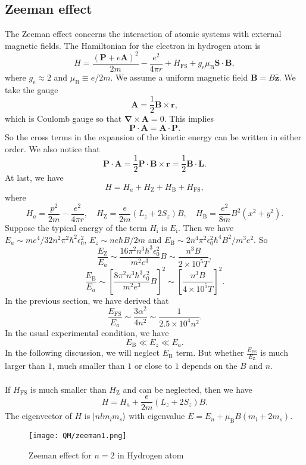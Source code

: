 \subsection{Zeeman effect}
The Zeeman effect concerns the interaction of atomic systems with external magnetic fields. The Hamiltonian for the electron in hydrogen atom is
\[H = \frac{(\bm{P}+e\bm{A})^2}{2m} - \frac{e^2}{4\pi r} + H_{\mathrm{FS}} + g_{\mathrm{e}} \mu_{\mathrm{B}}\bm{S}\cdot\bm{B},\]
where $g_{\mathrm{e}} \approx 2$ and $\mu_{\mathrm{B}} \equiv {e}/{2m}$.
We assume a uniform magnetic field $\bm{B} = B\hat{\bm{z}}$. We take the gauge
\[\bm{A} = \frac{1}{2}\bm{B}\times\bm{r},\]
which is Coulomb gauge so that $\bm{\nabla}\times\bm{A} = 0$. This implies
\[\bm{P}\cdot\bm{A} = \bm{A}\cdot\bm{P}.\]
So the cross terms in the expansion of the kinetic energy can be written in either order. 
We also notice that
\[\bm{P}\cdot\bm{A} = \frac{1}{2} \bm{P}\cdot\bm{B}\times\bm{r}  = \frac{1}{2}\bm{B}\cdot\bm{L}.\] 
At last, we have
\[H = H_a + H_{\mathrm{Z}} + H_{\mathrm{B}} + H_{\mathrm{FS}},\]
where
\[H_a = \frac{p^2}{2m} - \frac{e^2}{4\pi r} , \quad  H_{\mathrm{Z}} = \frac{e}{2m}(L_z + 2S_z)B , \quad H_{\mathrm{B}} = \frac{e^2}{8m}B^2(x^2+y^2).\]
Suppose the typical energy of the term $H_{\mathrm{i}}$ is $E_{\mathrm{i}}$. Then we have $E_a \sim {me^4}/{32 n^2 \pi^2\hbar^2\epsilon_0^2}$, $E_z \sim {ne\hbar B}/{2m}$ and $E_{\mathrm{B}} \sim  {2n^4\pi^2 \epsilon_0^2 \hbar^4 B^2}/{m^3 e^2}$. 
So
\[\frac{E_{\mathrm{Z}}}{E_a} \sim \frac{16\pi^2 n^3 \hbar^3 \epsilon_0^2}{m^2 e^3} B \sim \frac{n^3B}{2\times10^5 T},\]
\[\frac{E_{\mathrm{B}}}{E_a} \sim \left[ \frac{8\pi^2 n^3 \hbar^3 \epsilon_0^2}{m^2 e^3} B\right]^2 \sim \left[ \frac{n^3B}{4\times10^5 T} \right]^2.\]
In the previous section, we have derived that
\[\frac{E_{\mathrm{FS}}}{E_a} \sim \frac{3\alpha^2}{4n^2} \sim \frac{1}{2.5\times10^4 n^2}.\]
In the usual experimental condition, we have
\[E_{\mathrm{B}} \ll E_z \ll E_a.\]
In the following discussion, we will neglect $E_{\mathrm{B}}$ term.
But whether $\frac{E_{\mathrm{FS}}}{E_{\mathrm{Z}}}$ is much larger than $1$, much smaller than $1$ or close to $1$ depends on the $B$ and $n$.
\\ \\
If $H_{\mathrm{FS}}$ is much smaller than $H_{\mathrm{Z}}$ and can be neglected, then we have
\[H = H_a + \frac{e}{2m}(L_z + 2S_z)B.\]
The eigenvector of $H$ is $|nlm_lm_s\rangle$ with eigenvalue $E = E_n + \mu_{\mathrm{B}} B(m_l+2m_s)$.
\begin{figure}[!h]
	\centering
	\texttt{[image: QM/zeeman1.png]}
	\caption{Zeeman effect for $n=2$ in Hydrogen atom}
\end{figure}
